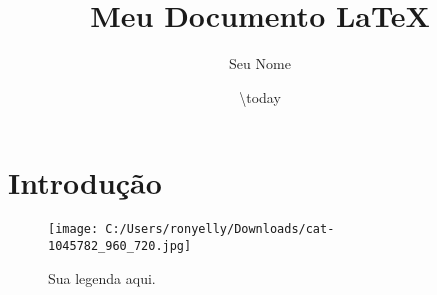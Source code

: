\documentclass{article}%
\title{Meu Documento LaTeX}%
\author{Seu Nome}%
\date{\textbackslash{}today}%
\begin{document}
%
\normalsize%
\section{Introdução}%
\label{sec:Introduo}%

\begin{figure}
  \centering
  \texttt{[image: C:/Users/ronyelly/Downloads/cat-1045782\_960\_720.jpg]}
  \caption{Sua legenda aqui.}
  \label{fig:suafigura}
\end{figure}
\end{document}
